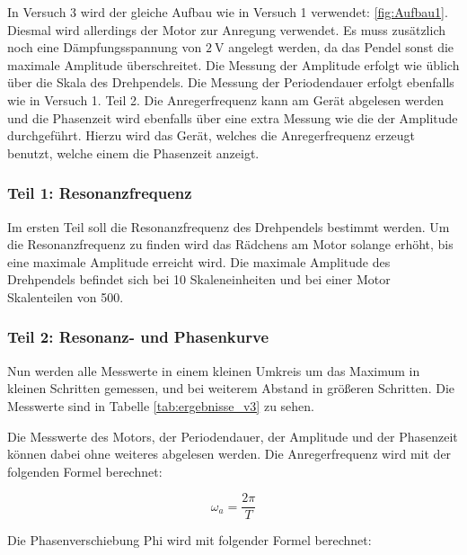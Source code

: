         In Versuch 3 wird der gleiche Aufbau wie in Versuch 1 verwendet: \ref{fig:Aufbau1}. Diesmal wird allerdings der Motor zur Anregung verwendet. Es muss zusätzlich noch eine Dämpfungsspannung von $2\ \mathrm{V}$ angelegt werden, da das Pendel sonst die maximale Amplitude überschreitet. Die Messung der Amplitude erfolgt wie üblich über die Skala des Drehpendels. Die Messung der Periodendauer erfolgt ebenfalls wie in Versuch 1. Teil 2. Die Anregerfrequenz kann am Gerät abgelesen werden und die Phasenzeit wird ebenfalls über eine extra Messung wie die der Amplitude durchgeführt. Hierzu wird das Gerät, welches die Anregerfrequenz erzeugt benutzt, welche einem die Phasenzeit anzeigt.

        \subsubsection{Teil 1: Resonanzfrequenz}
        
            Im ersten Teil soll die Resonanzfrequenz des Drehpendels bestimmt werden. Um die Resonanzfrequenz zu finden wird das Rädchens am Motor solange erhöht, bis eine maximale Amplitude erreicht wird. Die maximale Amplitude des Drehpendels befindet sich bei 10 Skaleneinheiten und bei einer Motor Skalenteilen von 500.

        \subsubsection{Teil 2: Resonanz- und Phasenkurve}
        \label{sec:3.2}
    
            Nun werden alle Messwerte in einem kleinen Umkreis um das Maximum in kleinen Schritten gemessen, und bei weiterem Abstand in größeren Schritten. Die Messwerte sind in Tabelle \ref{tab:ergebnisse_v3} zu sehen.

            Die Messwerte des Motors, der Periodendauer, der Amplitude und der Phasenzeit können dabei ohne weiteres abgelesen werden. Die Anregerfrequenz wird mit der folgenden Formel berechnet:

            \begin{equation}
                \omega_{a} = \frac{2 \pi}{T}
            \end{equation}

            Die Phasenverschiebung Phi wird mit folgender Formel berechnet:

